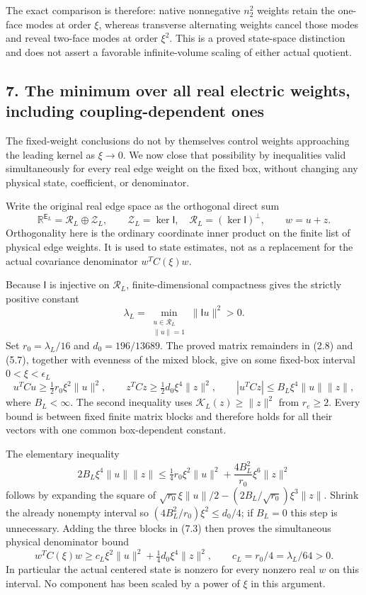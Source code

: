 \documentclass[
  11pt,
]{article}
\begin{document}
The exact comparison is therefore: native nonnegative \(n_2^2\) weights
retain the one-face modes at order \(\xi\), whereas transverse
alternating weights cancel those modes and reveal two-face modes at
order \(\xi^2\). This is a proved state-space distinction and does not
assert a favorable infinite-volume scaling of either actual quotient.

\subsection{7. The minimum over all real electric weights, including
coupling-dependent
ones}\label{magnetic-part-4-the-minimum-over-all-real-electric-weights-including-coupling-dependent-ones}

The fixed-weight conclusions do not by themselves control weights
approaching the leading kernel as \(\xi\to0\). We now close that
possibility by inequalities valid simultaneously for every real edge
weight on the fixed box, without changing any physical state,
coefficient, or denominator.

Write the original real edge space as the orthogonal direct sum \[
\mathbb R^{\mathsf E_L}=\mathscr R_L\oplus\mathscr Z_L,\qquad
\mathscr Z_L=\ker\mathsf I,\quad \mathscr R_L=(\ker\mathsf I)^\perp,
\qquad w=u+z.
\tag{7.1}
\] Orthogonality here is the ordinary coordinate inner product on the
finite list of physical edge weights. It is used to state estimates, not
as a replacement for the actual covariance denominator \(w^TC(\xi)w\).

Because \(\mathsf I\) is injective on \(\mathscr R_L\),
finite-dimensional compactness gives the strictly positive constant \[
\lambda_L=\min_{\substack{u\in\mathscr R_L\\\|u\|=1}}\|\mathsf Iu\|^2>0.
\tag{7.2}
\] Set \(r_0=\lambda_L/16\) and \(d_0=196/13689\). The proved matrix
remainders in (2.8) and (5.7), together with evenness of the mixed
block, give on some fixed-box interval \(0<\xi<\epsilon_L\) \[
u^TCu\ge\tfrac12r_0\xi^2\|u\|^2,\qquad
z^TCz\ge\tfrac12d_0\xi^4\|z\|^2,\qquad
|u^TCz|\le B_L\xi^4\|u\|\|z\|,
\tag{7.3}
\] where \(B_L<\infty\). The second inequality uses
\(\mathcal K_L(z)\ge\|z\|^2\) from \(r_e\ge2\). Every bound is between
fixed finite matrix blocks and therefore holds for all their vectors
with one common box-dependent constant.

The elementary inequality \[
2B_L\xi^4\|u\|\|z\|
\le\tfrac14r_0\xi^2\|u\|^2+
\frac{4B_L^2}{r_0}\xi^6\|z\|^2
\tag{7.4}
\] follows by expanding the square of
\(\sqrt{r_0}\xi\|u\|/2-(2B_L/\sqrt{r_0})\xi^3\|z\|\). Shrink the already
nonempty interval so \((4B_L^2/r_0)\xi^2\le d_0/4\); if \(B_L=0\) this
step is unnecessary. Adding the three blocks in (7.3) then proves the
simultaneous physical denominator bound \[
\boxed{w^TC(\xi)w\ge c_L\xi^2\|u\|^2+
\tfrac14d_0\xi^4\|z\|^2,\qquad c_L=r_0/4=\lambda_L/64>0.}
\tag{7.5}
\] In particular the actual centered state is nonzero for every nonzero
real \(w\) on this interval. No component has been scaled by a power of
\(\xi\) in this argument.
\end{document}
